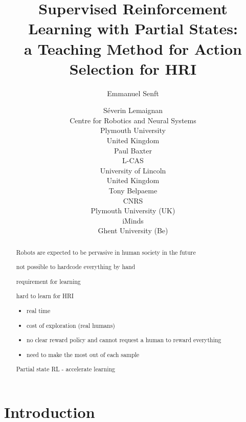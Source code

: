 \documentclass[letterpaper]{article} %
\begin{document}
%
\title{Supervised Reinforcement Learning with Partial States: \\
 a Teaching Method for Action Selection for HRI}

\author{Emmanuel Senft \and S\'{e}verin Lemaignan\\
Centre for Robotics and Neural Systems \\
Plymouth University \\
United Kingdom\\
\And Paul Baxter\\
L-CAS\\
University of Lincoln\\
United Kingdom\\
 \And Tony Belpaeme\\
 CNRS\\ Plymouth University (UK) \\ iMinds \\ Ghent University (Be)}

\maketitle
\begin{abstract}
Robots are expected to be pervasive in human society in the future

not possible to hardcode everything by hand

requirement for learning

hard to learn for HRI
\begin{itemize}
	\item real time
	\item cost of exploration (real humans)
	\item no clear reward policy and cannot request a human to reward everything
	\item need to make the most out of each sample
\end{itemize}

Partial state RL - accelerate learning


\end{abstract}

\section{Introduction}
\end{document}

